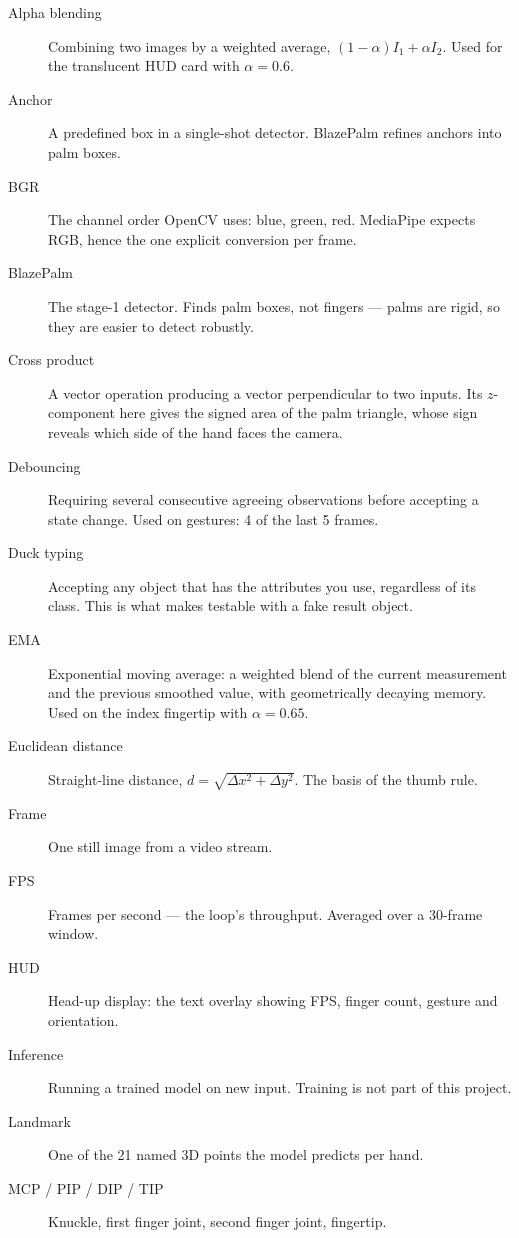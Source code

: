 \begin{description}
  \item[Alpha blending] Combining two images by a weighted average,
        $(1-\alpha)I_1 + \alpha I_2$. Used for the translucent HUD card with $\alpha = 0.6$.
  \item[Anchor] A predefined box in a single-shot detector. BlazePalm refines anchors into palm
        boxes.
  \item[BGR] The channel order OpenCV uses: blue, green, red. MediaPipe expects RGB, hence the one
        explicit conversion per frame.
  \item[BlazePalm] The stage-1 detector. Finds palm boxes, not fingers --- palms are rigid, so they
        are easier to detect robustly.
  \item[Cross product] A vector operation producing a vector perpendicular to two inputs. Its
        $z$-component here gives the signed area of the palm triangle, whose sign reveals which side
        of the hand faces the camera.
  \item[Debouncing] Requiring several consecutive agreeing observations before accepting a state
        change. Used on gestures: 4 of the last 5 frames.
  \item[Duck typing] Accepting any object that has the attributes you use, regardless of its class.
        This is what makes  testable with a fake result object.
  \item[EMA] Exponential moving average: a weighted blend of the current measurement and the previous
        smoothed value, with geometrically decaying memory. Used on the index fingertip with
        $\alpha = 0.65$.
  \item[Euclidean distance] Straight-line distance,
        $d = \sqrt{\Delta x^2 + \Delta y^2}$. The basis of the thumb rule.
  \item[Frame] One still image from a video stream.
  \item[FPS] Frames per second --- the loop's throughput. Averaged over a 30-frame window.
  \item[HUD] Head-up display: the text overlay showing FPS, finger count, gesture and orientation.
  \item[Inference] Running a trained model on new input. Training is not part of this project.
  \item[Landmark] One of the 21 named 3D points the model predicts per hand.
  \item[MCP / PIP / DIP / TIP] Knuckle, first finger joint, second finger joint, fingertip.

\end{description}
